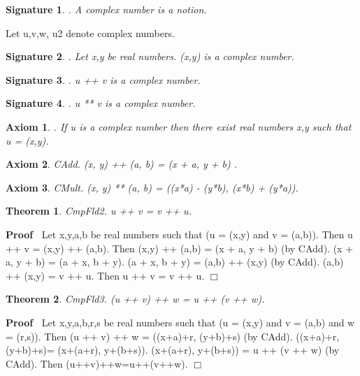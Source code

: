 \documentclass{article}
\newenvironment{forthel}{\begin{leftbar}}{\end{leftbar}}
\newenvironment{proof}{\noindent\textbf{Proof\ }}{\hspace*{\fill}$\Box$\medskip}
\newtheorem{axiom}{Axiom}
\newtheorem{theorem}{Theorem}
\newtheorem{signature}{Signature}
\begin{document}
\begin{forthel}
\begin{signature}. A complex number is a notion.

\end{signature}
Let u,v,w, u2 denote complex numbers.
\begin{signature}. Let x,y be real numbers. (x,y) is a complex number.

\end{signature}
\begin{signature}. u ++ v is a complex number.

\end{signature}
\begin{signature}. u ** v is a complex number.

\end{signature}
\begin{axiom}. If u is a complex number then there exist real numbers x,y such that u = (x,y).

\end{axiom}
\begin{axiom} CAdd. (x, y) ++ (a, b) = (x + a, y + b) .

\end{axiom}
\begin{axiom} CMult. (x, y) ** (a, b) = ((x*a) - (y*b), (x*b) + (y*a)).

\end{axiom}




\begin{theorem}
 CmpFld2.  u ++ v = v ++ u.
\end{theorem}\begin{proof}
 Let x,y,a,b be real numbers such that (u = (x,y) and v = (a,b)).
Then u ++ v = (x,y) ++ (a,b).
Then (x,y) ++ (a,b) = (x + a, y + b) (by CAdd).	
(x + a, y + b) = (a + x, b + y). 
(a + x, b + y) = (a,b) ++ (x,y) (by CAdd).
(a,b) ++ (x,y) = v ++ u. 
Then u ++ v = v ++ u.
\end{proof}
 



\begin{theorem}
 CmpFld3. (u ++ v) ++ w = u ++ (v ++ w).
\end{theorem}\begin{proof}
 Let x,y,a,b,r,s be real numbers such that (u = (x,y) and v = (a,b) and w = (r,s)).
Then (u ++ v) ++ w = ((x+a)+r, (y+b)+s) (by CAdd). 
((x+a)+r, (y+b)+s)= (x+(a+r), y+(b+s)).
(x+(a+r), y+(b+s)) = u ++ (v ++ w) (by CAdd).
Then (u++v)++w=u++(v++w). 
\end{proof}



\end{forthel}
\end{document}
